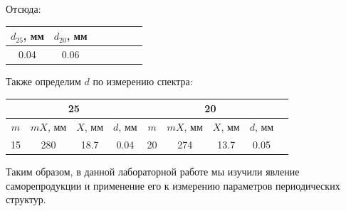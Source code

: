 \documentclass[14pt]{article}
\begin{document}
Отсюда:
\begin{center}
\begin{tabular}{|c|c|c|c|c|c|c|}
\hline
$d_{25}$, мм	&	$d_{20}$, мм	\\
\hline
0.04			&	0.06			\\
\hline
\end{tabular}
\end{center}

\vspace{1cm}
Также определим $d$ по измерению спектра:

\begin{center}
\begin{tabular}{|c|c|c|c|c|c|c|c|c|}
\hline
\multicolumn{4}{|c|}{25}					&	\multicolumn{4}{|c|}{20}						\\
\hline
$m$	&	$mX$, мм	&	$X$, мм	&	$d$, мм	&	$m$	&	$mX$, мм	&	$X$, мм	&	$d$, мм		\\
\hline
15	&	280			&	18.7	&	0.04	&	20	&	274			&	13.7	&	0.05		\\
\hline
\end{tabular}
\end{center}

\newpage
Таким образом, в данной лабораторной работе мы изучили явление саморепродукции и применение его к измерению параметров периодических структур.
\end{document}
